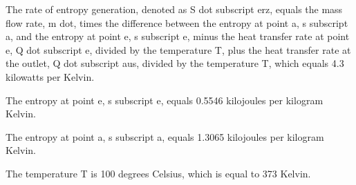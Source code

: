 The rate of entropy generation, denoted as S dot subscript erz, equals the mass flow rate, m dot, times the difference between the entropy at point a, s subscript a, and the entropy at point e, s subscript e, minus the heat transfer rate at point e, Q dot subscript e, divided by the temperature T, plus the heat transfer rate at the outlet, Q dot subscript aus, divided by the temperature T, which equals 4.3 kilowatts per Kelvin.

The entropy at point e, s subscript e, equals 0.5546 kilojoules per kilogram Kelvin.

The entropy at point a, s subscript a, equals 1.3065 kilojoules per kilogram Kelvin.

The temperature T is 100 degrees Celsius, which is equal to 373 Kelvin.